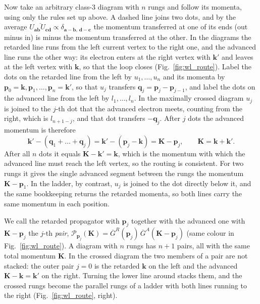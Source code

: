 Now take an arbitrary class-3 diagram with $n$ rungs and follow its momenta, using only the rules set up above. A dashed line joins two dots, and by the average $\overline{U_{\mathbf a\mathbf b}U_{\mathbf c\mathbf d}}\propto\delta_{\mathbf a-\mathbf b,\,\mathbf d-\mathbf c}$ the momentum transferred at one of its ends (out minus in) is minus the momentum transferred at the other. In the diagrams the retarded line runs from the left current vertex to the right one, and the advanced line runs the other way: its electron enters at the right vertex with $\mathbf k'$ and leaves at the left vertex with $\mathbf k$, so that the loop closes (Fig.~\ref{fig:wl_route}). Label the dots on the retarded line from the left by $u_1,\dots,u_n$ and its momenta by $\mathbf p_0=\mathbf k,\mathbf p_1,\dots,\mathbf p_n=\mathbf k'$, so that $u_j$ transfers $\mathbf q_j=\mathbf p_j-\mathbf p_{j-1}$, and label the dots on the advanced line from the left by $l_1,\dots,l_n$. In the maximally crossed diagram $u_j$ is joined to the $j$-th dot that the advanced electron meets, counting from the right, which is $l_{n+1-j}$, and that dot transfers $-\mathbf q_j$. After $j$ dots the advanced momentum is therefore
\begin{equation}
\mathbf k'-(\mathbf q_1+\dots+\mathbf q_j)=\mathbf k'-(\mathbf p_j-\mathbf k)=\mathbf K-\mathbf p_j ,
\qquad\mathbf K=\mathbf k+\mathbf k' .
\label{eq:wl_route}
\end{equation}
After all $n$ dots it equals $\mathbf K-\mathbf k'=\mathbf k$, which is the momentum with which the advanced line must reach the left vertex, so the routing is consistent. For two rungs it gives the single advanced segment between the rungs the momentum $\mathbf K-\mathbf p_1$. In the ladder, by contrast, $u_j$ is joined to the dot directly below it, and the same bookkeeping returns the retarded momenta, so both lines carry the same momentum in each position.

We call the retarded propagator with $\mathbf p_j$ together with the advanced one with $\mathbf K-\mathbf p_j$ the $j$-th \emph{pair}, $\mathcal P_{\mathbf p_j}(\mathbf K)=\overline G^R(\mathbf p_j)\,\overline G^A(\mathbf K-\mathbf p_j)$ (same colour in Fig.~\ref{fig:wl_route}). A diagram with $n$ rungs has $n+1$ pairs, all with the same total momentum $\mathbf K$. In the crossed diagram the two members of a pair are not stacked: the outer pair $j=0$ is the retarded $\mathbf k$ on the left and the advanced $\mathbf K-\mathbf k=\mathbf k'$ on the right. Turning the lower line around stacks them, and the crossed rungs become the parallel rungs of a ladder with both lines running to the right (Fig.~\ref{fig:wl_route}, right).

